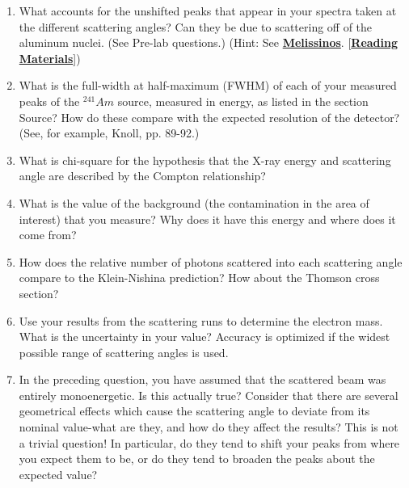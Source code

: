 \documentclass{../lab}
\begin{document}
\begin{enumerate}
    \item What accounts for the unshifted peaks that appear in your spectra taken at the different scattering angles? Can they be due to scattering off of the aluminum nuclei. (See Pre-lab questions.) (Hint: See \href{http://physics111.lib.berkeley.edu/Physics111/Reprints/COM/Melissinos\%201966\%20pg\%20252-265\%20and\%20369-384.pdf}{\textbf{Melissinos}}. [\href{http://physics111.lib.berkeley.edu/Physics111/Reprints/COM/COM\_index.html}{\textbf{Reading Materials}}])

    \item What is the full-width at half-maximum (FWHM) of each of your measured peaks of the $^{241}Am$ source, measured in energy, as listed in the section Source? How do these compare with the expected resolution of the detector? (See, for example, Knoll, pp. 89-92.)
    
    \item What is chi-square for the hypothesis that the X-ray energy and scattering angle are described by the Compton relationship?
    
    \item What is the value of the background (the contamination in the area of interest) that you measure? Why does it have this energy and where does it come from?
    
    \item How does the relative number of photons scattered into each scattering angle compare to the Klein-Nishina prediction? How about the Thomson cross section?
    
    \item Use your results from the scattering runs to determine the electron mass. What is the uncertainty in your value? Accuracy is optimized if the widest possible range of scattering angles is used.
    
    \item In the preceding question, you have assumed that the scattered beam was entirely monoenergetic. Is this actually true? Consider that there are several geometrical effects which cause the scattering angle to deviate from its nominal value-what are they, and how do they affect the results? This is not a trivial question! In particular, do they tend to shift your peaks from where you expect them to be, or do they tend to broaden the peaks about the expected value?
    

\end{enumerate}
\end{document}
